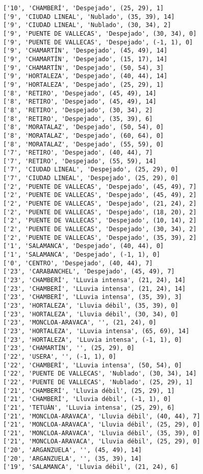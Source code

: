 \documentclass[11pt]{article}
\begin{document}
\begin{Verbatim}[commandchars=\\\{\}]
['10', 'CHAMBERÍ', 'Despejado', (25, 29), 1]
['9', 'CIUDAD LINEAL', 'Nublado', (35, 39), 14]
['9', 'CIUDAD LINEAL', 'Nublado', (30, 34), 2]
['9', 'PUENTE DE VALLECAS', 'Despejado', (30, 34), 0]
['9', 'PUENTE DE VALLECAS', 'Despejado', (-1, 1), 0]
['9', 'CHAMARTÍN', 'Despejado', (45, 49), 14]
['9', 'CHAMARTÍN', 'Despejado', (15, 17), 14]
['9', 'CHAMARTÍN', 'Despejado', (50, 54), 3]
['9', 'HORTALEZA', 'Despejado', (40, 44), 14]
['9', 'HORTALEZA', 'Despejado', (25, 29), 1]
['8', 'RETIRO', 'Despejado', (45, 49), 14]
['8', 'RETIRO', 'Despejado', (45, 49), 14]
['8', 'RETIRO', 'Despejado', (30, 34), 2]
['8', 'RETIRO', 'Despejado', (35, 39), 6]
['8', 'MORATALAZ', 'Despejado', (50, 54), 0]
['8', 'MORATALAZ', 'Despejado', (60, 64), 0]
['8', 'MORATALAZ', 'Despejado', (55, 59), 0]
['7', 'RETIRO', 'Despejado', (40, 44), 7]
['7', 'RETIRO', 'Despejado', (55, 59), 14]
['7', 'CIUDAD LINEAL', 'Despejado', (25, 29), 0]
['7', 'CIUDAD LINEAL', 'Despejado', (25, 29), 0]
['2', 'PUENTE DE VALLECAS', 'Despejado', (45, 49), 7]
['2', 'PUENTE DE VALLECAS', 'Despejado', (45, 49), 2]
['2', 'PUENTE DE VALLECAS', 'Despejado', (21, 24), 2]
['2', 'PUENTE DE VALLECAS', 'Despejado', (18, 20), 2]
['2', 'PUENTE DE VALLECAS', 'Despejado', (10, 14), 2]
['2', 'PUENTE DE VALLECAS', 'Despejado', (30, 34), 2]
['2', 'PUENTE DE VALLECAS', 'Despejado', (35, 39), 2]
['1', 'SALAMANCA', 'Despejado', (40, 44), 0]
['1', 'SALAMANCA', 'Despejado', (-1, 1), 0]
['0', 'CENTRO', 'Despejado', (40, 44), 7]
['23', 'CARABANCHEL', 'Despejado', (45, 49), 7]
['23', 'CHAMBERÍ', 'LLuvia intensa', (21, 24), 14]
['23', 'CHAMBERÍ', 'LLuvia intensa', (21, 24), 14]
['23', 'CHAMBERÍ', 'LLuvia intensa', (35, 39), 3]
['23', 'HORTALEZA', 'Lluvia débil', (35, 39), 0]
['23', 'HORTALEZA', 'Lluvia débil', (30, 34), 0]
['23', 'MONCLOA-ARAVACA', '', (21, 24), 0]
['23', 'HORTALEZA', 'LLuvia intensa', (65, 69), 14]
['23', 'HORTALEZA', 'LLuvia intensa', (-1, 1), 0]
['23', 'CHAMARTÍN', '', (25, 29), 0]
['22', 'USERA', '', (-1, 1), 0]
['22', 'CHAMBERÍ', 'LLuvia intensa', (50, 54), 0]
['22', 'PUENTE DE VALLECAS', 'Nublado', (30, 34), 14]
['22', 'PUENTE DE VALLECAS', 'Nublado', (25, 29), 1]
['21', 'CHAMBERÍ', 'Lluvia débil', (25, 29), 1]
['21', 'CHAMBERÍ', 'Lluvia débil', (-1, 1), 0]
['21', 'TETUÁN', 'LLuvia intensa', (25, 29), 6]
['21', 'MONCLOA-ARAVACA', 'Lluvia débil', (40, 44), 7]
['21', 'MONCLOA-ARAVACA', 'Lluvia débil', (25, 29), 0]
['21', 'MONCLOA-ARAVACA', 'Lluvia débil', (35, 39), 0]
['21', 'MONCLOA-ARAVACA', 'Lluvia débil', (25, 29), 0]
['20', 'ARGANZUELA', '', (45, 49), 14]
['20', 'ARGANZUELA', '', (35, 39), 14]
['19', 'SALAMANCA', 'Lluvia débil', (21, 24), 6]

\end{Verbatim}
\end{document}

